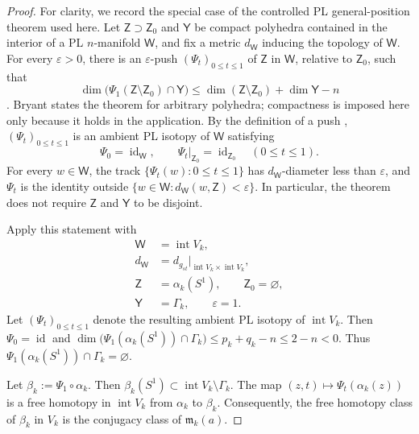 \documentclass[12pt,oneside,a4paper]{article}
\theoremstyle{mytheorem}
\theoremstyle{remark}
\theoremstyle{definition}
\begin{document}
\begin{proof}
For clarity, we record the special case of the controlled PL
general-position theorem used here.  Let
$\mathsf Z\supset\mathsf Z_0$ and $\mathsf Y$ be compact polyhedra
contained in the interior of a PL $n$-manifold $\mathsf W$, and fix a
metric $d_{\mathsf W}$ inducing the topology of $\mathsf W$.
For every $\varepsilon>0$, there is an $\varepsilon$-push
$(\Psi_t)_{0\leq t\leq1}$ of $\mathsf Z$ in $\mathsf W$, relative
to $\mathsf Z_0$, such that
\[
 \dim\bigl(\Psi_1(\mathsf Z\setminus\mathsf Z_0)
                 \cap\mathsf Y\bigr)
 \leq\dim(\mathsf Z\setminus\mathsf Z_0)+\dim\mathsf Y-n
\]
\cite[Theorem~4.2]{zbMATH01714503}.  Bryant states the theorem for
arbitrary polyhedra; compactness is imposed here only because it holds
in the application.  By the definition of a push
\cite[\S4]{zbMATH01714503}, $(\Psi_t)_{0\leq t\leq1}$ is an ambient
PL isotopy of $\mathsf W$ satisfying
\[
 \Psi_0=\operatorname{id}_{\mathsf W},
 \qquad
 \Psi_t|_{\mathsf Z_0}=\operatorname{id}_{\mathsf Z_0}
 \quad(0\leq t\leq1).
\]
For every $w\in\mathsf W$, the track
$\{\Psi_t(w):0\leq t\leq1\}$ has $d_{\mathsf W}$-diameter less than
$\varepsilon$, and $\Psi_t$ is the identity outside
\(\bigl\{w\in\mathsf W:
d_{\mathsf W}(w,\mathsf Z)<\varepsilon\bigr\}\).
In particular, the theorem does not require $\mathsf Z$ and
$\mathsf Y$ to be disjoint.

Apply this statement with
\[
\begin{aligned}
 \mathsf W&=\operatorname{int}V_k,\\
 d_{\mathsf W}
 &=d_{g_{st}}|_{\operatorname{int}V_k\times\operatorname{int}V_k},\\
 \mathsf Z&=\alpha_k(S^1),\qquad
 \mathsf Z_0=\varnothing,\\
 \mathsf Y&=\Gamma_k,\qquad \varepsilon=1.
\end{aligned}
\]
Let $(\Psi_t)_{0\leq t\leq1}$ denote the resulting ambient PL isotopy
of $\operatorname{int}V_k$.  Then $\Psi_0=\operatorname{id}$ and
\(\dim\bigl(\Psi_1(\alpha_k(S^1))\cap\Gamma_k\bigr)
\leq p_k+q_k-n\leq2-n<0\).
Thus $\Psi_1(\alpha_k(S^1))\cap\Gamma_k=\varnothing$.

Let $\beta_k:=\Psi_1\circ\alpha_k$.  Then
$\beta_k(S^1)\subset\operatorname{int}V_k\setminus\Gamma_k$.  The map
$(z,t)\mapsto \Psi_t(\alpha_k(z))$ is a free homotopy in
$\operatorname{int}V_k$ from $\alpha_k$ to $\beta_k$.  Consequently, the
free homotopy class of $\beta_k$ in $V_k$ is the conjugacy class of
$\mathfrak{m}_k(a)$.


\end{proof}
\end{document}
